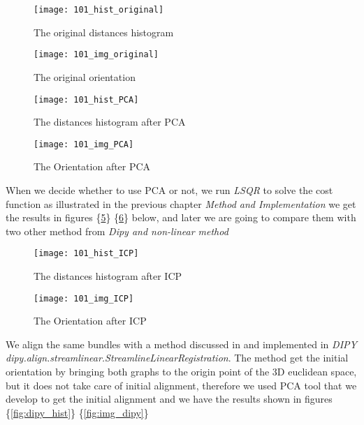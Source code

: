 \documentclass[../structure.tex]{subfiles}
\begin{document}
\begin{figure}[h!]
\centering
\texttt{[image: 101\_hist\_original]}
\captionsetup{justification=centering}
\caption{The original distances histogram}
\label{fig:hist_original}
\end{figure}

\begin{figure}[h!]
\centering
\texttt{[image: 101\_img\_original]}
\captionsetup{justification=centering}
\caption{The original orientation}
\label{fig:img_original}
\end{figure}
\pagebreak
\begin{figure}[h!]
\centering
\texttt{[image: 101\_hist\_PCA]}
\captionsetup{justification=centering}
\caption{The distances histogram after PCA}
\label{fig:hist_PCA}
\end{figure}

\begin{figure}[h!]
\centering
\texttt{[image: 101\_img\_PCA]}
\captionsetup{justification=centering}
\caption{The Orientation after PCA}
\label{fig:img_PCA}
\end{figure}
\pagebreak
When we decide whether to use PCA or not, we run \textit{LSQR} to solve the cost function as illustrated in the previous chapter \textit{Method and Implementation} we get the results in figures \{\ref{fig:hist_ICP}\} \{\ref{fig:img_ICP}\} below, and later we are going to compare them with two other method from \textit{Dipy and non-linear method}

\begin{figure}[h!]
\centering
\texttt{[image: 101\_hist\_ICP]}
\captionsetup{justification=centering}
\caption{The distances histogram after ICP}
\label{fig:hist_ICP}
\end{figure}

\begin{figure}[h!]
\centering
\texttt{[image: 101\_img\_ICP]}
\captionsetup{justification=centering}
\caption{The Orientation after ICP}
\label{fig:img_ICP}
\end{figure}
\pagebreak
We align the same bundles with a method discussed in \cite{ODonnell2012} and implemented in \textit{DIPY dipy.align.streamlinear.StreamlineLinearRegistration}. The method get the initial orientation by bringing both graphs to the origin point of the 3D euclidean space, but it does not take care of initial alignment, therefore we used PCA tool that we develop to get the initial alignment and we have the results shown in figures \{\ref{fig:dipy_hist}\} \{\ref{fig:img_dipy}\}
\end{document}
